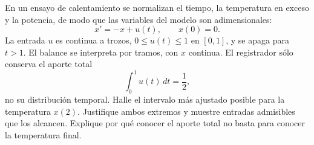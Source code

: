 En un ensayo de calentamiento se normalizan el tiempo, la temperatura en exceso y la potencia, de modo que las variables del modelo son adimensionales:
\[
x'=-x+u(t),\qquad x(0)=0.
\]
La entrada \(u\) es continua a trozos, \(0\le u(t)\le1\) en \([0,1]\), y se apaga para \(t>1\). El balance se interpreta por tramos, con \(x\) continua. El registrador sólo conserva el aporte total
\[
\int_0^1u(t)\,dt=\frac12,
\]
no su distribución temporal. Halle el intervalo más ajustado posible para la temperatura \(x(2)\). Justifique ambos extremos y muestre entradas admisibles que los alcancen. Explique por qué conocer el aporte total no basta para conocer la temperatura final.

